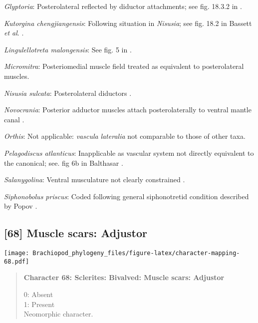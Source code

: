 \documentclass[openany]{book}
\theoremstyle{definition}
\theoremstyle{definition}
\theoremstyle{definition}
\theoremstyle{remark}
\begin{document}
\hypertarget{Glyptoria-coding-67}{}
\emph{Glyptoria}: Posterolateral reflected by diductor attachments; see
fig. 18.3.2 in \citet{Bassett2001Functionalmorphology}.

\hypertarget{Kutorgina_chengjiangensis-coding-67}{}
\emph{Kutorgina chengjiangensis}: Following situation in \emph{Nisusia};
see fig. 18.2 in Bassett \emph{et al}.
\citeyearpar{Bassett2001Functionalmorphology}.

\hypertarget{Lingulellotreta_malongensis-coding-67}{}
\emph{Lingulellotreta malongensis}: See fig. 5 in
\citet{Holmer1997EarlyCambrian}.

\hypertarget{Micromitra-coding-67}{}
\emph{Micromitra}: Posteriomedial muscle field \citep[text-fig.
6]{Williams1998Thediversity} treated as equivalent to posterolateral
muscles.

\hypertarget{Nisusia_sulcata-coding-67}{}
\emph{Nisusia sulcata}: Posterolateral diductors \citep[fig. 18.2
in][]{Bassett2001Functionalmorphology}.

\hypertarget{Novocrania-coding-67}{}
\emph{Novocrania}: Posterior adductor muscles attach posterolaterally to
ventral mantle canal \citep{Robinson2014Themuscles}.

\hypertarget{Orthis-coding-67}{}
\emph{Orthis}: Not applicable: \emph{vascula} \emph{lateralia} not
comparable to those of other taxa.

\hypertarget{Pelagodiscus_atlanticus-coding-67}{}
\emph{Pelagodiscus atlanticus}: Inapplicable as vascular system not
directly equivalent to the canonical; see. fig 6b in Balthasar
\citeyearpar{Balthasar2009Thebrachiopod}.

\hypertarget{Salanygolina-coding-67}{}
\emph{Salanygolina}: Ventral musculature not clearly constrained
\citep{Holmer2009Theenigmatic}.

\hypertarget{Siphonobolus_priscus-coding-67}{}
\emph{Siphonobolus priscus}: Coded following general siphonotretid
condition described by Popov \citeyearpar[p.~407]{Popov1992TheCambrian}.

\subsection*{{[}68{]} Muscle scars:
Adjustor}\label{muscle-scars-adjustor}

\texttt{[image: Brachiopod\_phylogeny\_files/figure-latex/character-mapping-68.pdf]}

\begin{quote}
\textbf{Character 68: Sclerites: Bivalved: Muscle scars: Adjustor}

0: Absent\\
1: Present\\
Neomorphic character.
\end{quote}
\end{document}
